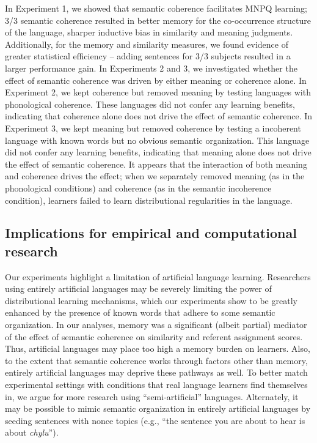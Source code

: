 \documentclass[man,floatsintext]{apa6}
\begin{document}
In Experiment 1, we showed that semantic coherence facilitates MNPQ
learning; 3/3 semantic coherence resulted in better memory for the
co-occurrence structure of the language, sharper inductive bias in
similarity and meaning judgments. Additionally, for the memory and
similarity measures, we found evidence of greater statistical
efficiency -- adding sentences for 3/3 subjects resulted in a larger
performance gain. In Experiments 2 and 3, we investigated whether the
effect of semantic coherence was driven by either meaning or coherence
alone. In Experiment 2, we kept coherence but removed meaning by
testing languages with phonological coherence. These languages did not
confer any learning benefits, indicating that coherence alone does not
drive the effect of semantic coherence. In Experiment 3, we kept
meaning but removed coherence by testing a incoherent language with
known words but no obvious semantic organization. This language did
not confer any learning benefits, indicating that meaning alone does
not drive the effect of semantic coherence. It appears that the
interaction of both meaning and coherence drives the effect; when we
separately removed meaning (as in the phonological conditions) and
coherence (as in the semantic incoherence condition), learners failed
to learn distributional regularities in the language.

\subsection{Implications for empirical and computational research}

Our experiments highlight a limitation of artificial language
learning. Researchers using entirely artificial languages may be
severely limiting the power of distributional learning mechanisms,
which our experiments show to be greatly enhanced by the presence of
known words that adhere to some semantic organization. In our
analyses, memory was a significant (albeit partial) mediator of the
effect of semantic coherence on similarity and referent assignment
scores. Thus, artificial languages may place too high a memory burden
on learners. Also, to the extent that semantic coherence works through
factors other than memory, entirely artificial languages may deprive
these pathways as well. To better match experimental settings with
conditions that real language learners find themselves in, we argue
for more research using ``semi-artificial'' languages. Alternately, it
may be possible to mimic semantic organization in entirely artificial
languages by seeding sentences with nonce topics (e.g., ``the sentence
you are about to hear is about \emph{chylu}'').
\end{document}

